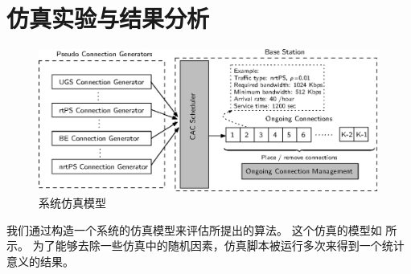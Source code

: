 \section{仿真实验与结果分析} 
\begin{figure}[tb]
\centering
\includegraphics [scale=1.2] {cacop_simulator.eps}
\caption{系统仿真模型} 
\label{fig:chap_cacop:sim_cfg}
\end{figure}
我们通过构造一个系统的仿真模型来评估所提出的算法。
这个仿真的模型如 所示。
为了能够去除一些仿真中的随机因素，仿真脚本被运行多次来得到一个统计意义的结果。

